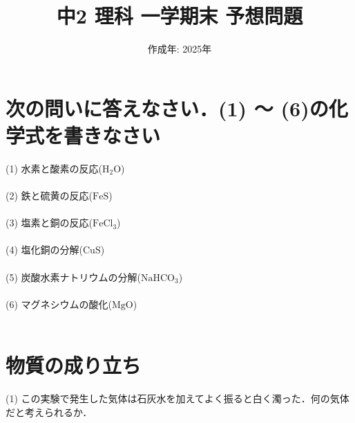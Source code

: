 \documentclass[autodetect-engine,dvi=dvipdfmx,ja=standard,
               a4j,11pt]{bxjsarticle}
\title{中2 理科 一学期末 予想問題}
\author{}
\date{作成年: 2025年\\}  %
\begin{document}
\maketitle
\section{\textbf{次の問いに答えなさい．(1) ～ (6)の化学式を書きなさい}}
    (1) 水素と酸素の反応($\mathrm{H_2O}$)\\\\

    (2) 鉄と硫黄の反応($\mathrm{FeS}$)\\\\

    (3) 塩素と銅の反応($\mathrm{FeCl_3}$)\\\\

    (4) 塩化銅の分解($\mathrm{CuS} $)\\\\

    (5) 炭酸水素ナトリウムの分解($\mathrm{NaHCO_3}$)\\\\

    (6) マグネシウムの酸化($\mathrm{MgO} $)\\\\
    \clearpage
\section{物質の成り立ち}
\begin{figure}[htb]
        \centering
        \vspace{20pt} %
        \caption{}
\end{figure}
    (1) この実験で発生した気体は石灰水を加えてよく振ると白く濁った．何の気体だと考えられるか．\\\\
\end{document}
